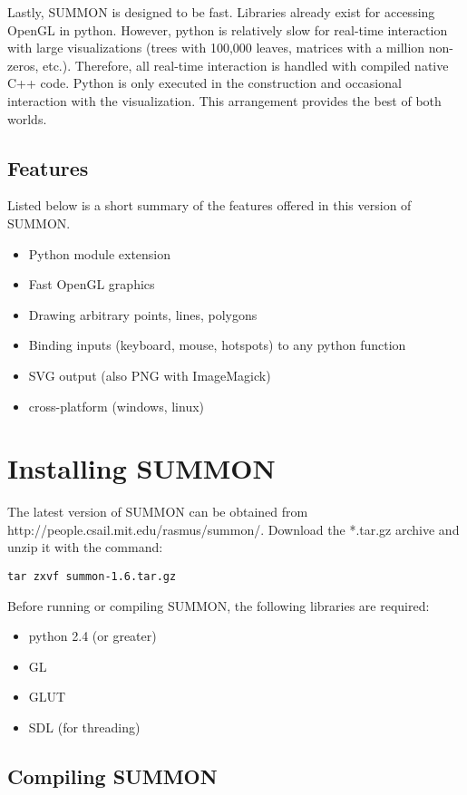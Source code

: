 \documentclass[12pt]{article}
\newcommand{\items}[1]{\begin{itemize} #1 \end{itemize}}
\newcommand{\codeblock}[1]{\vspace{.1in} {\tt #1} \vspace{.1in}}
\begin{document}
Lastly, SUMMON is designed to be fast.  Libraries already exist for
accessing OpenGL in python.  However, python is relatively slow for real-time
interaction with large visualizations (trees with 100,000 leaves, matrices with
a million non-zeros, etc.).  Therefore, all real-time interaction is handled
with compiled native C++ code.  Python is only executed in the construction 
and occasional interaction with the visualization.  This arrangement provides 
the best of both worlds.




\subsection{Features}

Listed below is a short summary of the features offered in this version of
SUMMON.

\items{
    \item Python module extension
    \item Fast OpenGL graphics
    \item Drawing arbitrary points, lines, polygons
    \item Binding inputs (keyboard, mouse, hotspots) to any python function 
    \item SVG output (also PNG with ImageMagick)
    \item cross-platform (windows, linux)
}

\section{Installing SUMMON}
\label{sec:installing}

The latest version of SUMMON can be obtained from 
http://people.csail.mit.edu/rasmus/summon/.  Download the *.tar.gz archive and
unzip it with the command:

\codeblock{tar zxvf summon-1.6.tar.gz}

Before running or compiling SUMMON, the following libraries are required:
\items {
    \item python 2.4 (or greater)
    \item GL   
    \item GLUT
    \item SDL (for threading)
}

\subsection{Compiling SUMMON}
\end{document}
